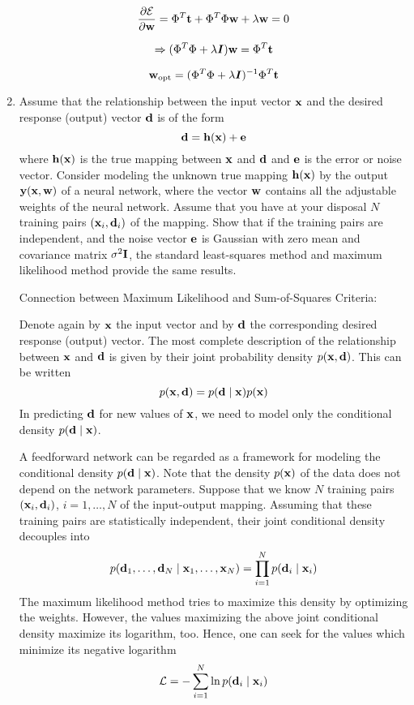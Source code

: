 \begin{enumerate}
\begin{solution}
    \[
    \frac{\partial \mathcal{E}}{\partial {\bf{w}}} = \Phi^T {\bf{t}} + \Phi^T
    \Phi {\bf{w}} + \lambda {\bf{w}} = 0
    \]

    \[
    \Rightarrow (\Phi^T \Phi + \lambda \boldsymbol{I}){\bf{w}} = \Phi^T {\bf{t}}
    \]

    \[
    {\bf{w}}_{\text{opt}} = (\Phi^T \Phi + \lambda \boldsymbol{I})^{-1}\Phi^T {\bf{t}}
    \]
  \end{solution}
  

\item Assume that the relationship between the input vector ${\bf x}$
  and the desired response (output) vector ${\bf d}$ is of the form
  \[{\bf d} = {\bf h}({\bf x}) + {\bf e}\]
  where ${\bf h}({\bf x})$ is the true mapping between ${\bf x}$ and ${\bf d}$
  and ${\bf e}$ is the error or noise vector. Consider modeling the unknown
  true mapping ${\bf h}({\bf x})$ by the output ${\bf y}({\bf x},{\bf w})$
  of a neural network, where the vector ${\bf w}$ contains all the adjustable
  weights of the neural network. Assume that you have at your disposal
  $N$ training pairs $({\bf x}_i,{\bf d}_i)$ of the mapping. Show that if the
  training pairs are independent, and the noise vector ${\bf e}$
  is Gaussian with zero mean and covariance matrix $\sigma^2 {\bf I}$, the standard
  least-squares method and maximum likelihood method provide the same results.

  \begin{solution}

    Connection between Maximum Likelihood and Sum-of-Squares Criteria:

    Denote again by ${\bf x}$ the input vector and by ${\bf d}$ the
    corresponding desired response (output) vector. The most complete description of the relationship between
    ${\bf x}$ and ${\bf d}$ is given by their joint probability density
    $p({\bf x},{\bf d})$.
    This can be written
    \[
    p({\bf x},{\bf d}) = p({\bf d} \mid {\bf x}) p({\bf x})
    \]
    In predicting ${\bf d}$ for new values of ${\bf x}$, we need to
    model only the conditional density $p({\bf d} \mid {\bf x})$.


    A feedforward network can be regarded as a framework for modeling
    the conditional density $p({\bf d} \mid {\bf x})$. Note that the density $p({\bf x})$ of the data does not depend
    on the network parameters. Suppose that we know $N$ training pairs $({\bf x}_i,{\bf d}_i)$,
    $i=1,\ldots,N$ of the input-output mapping. Assuming that these training pairs are statistically independent,
    their joint conditional density decouples into
    \[
    p({\bf d}_1,\ldots,{\bf d}_N \mid {\bf x}_1,\ldots,{\bf x}_N) =
    \prod_{i=1}^N p({\bf d}_i \mid {\bf x}_i)
    \]
    The maximum likelihood method tries to maximize this density by optimizing the weights.
    However, the values maximizing the above joint conditional density maximize
    its logarithm, too. Hence, one can seek for the values which minimize its
    negative logarithm
    \[
    {\cal L} = - \sum_{i=1}^N \ln p({\bf d}_i \mid {\bf x}_i)
    \]


\end{solution}
\end{enumerate}
